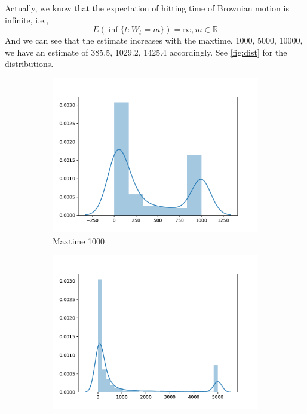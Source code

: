 \documentclass{homework}
\begin{document}
\begin{subproblem}[\roman*)]
{            Actually, we know that the expectation of hitting time of Brownian
            motion is infinite, i.e.,
            \[E(\inf{\{t:W_t=m\}})=\infty,m\in\mathbb R\]
            And we can see that the estimate increases with the maxtime.
        } 1000, 5000, 10000,
        we have an estimate
        of 385.5, 1029.2, 1425.4 accordingly. See \cref{fig:dist}
        for the distributions.
        \begin{figure}[h]
            \centering
            \begin{subfigure}[b]{0.3\textwidth}
                \includegraphics[width=\textwidth]{max=1000}
                \caption{Maxtime 1000}
            \end{subfigure}
            \begin{subfigure}[b]{0.3\textwidth}
                \includegraphics[width=\textwidth]{max=5000}

\end{subfigure}
\end{figure}
\end{subproblem}
\end{document}
